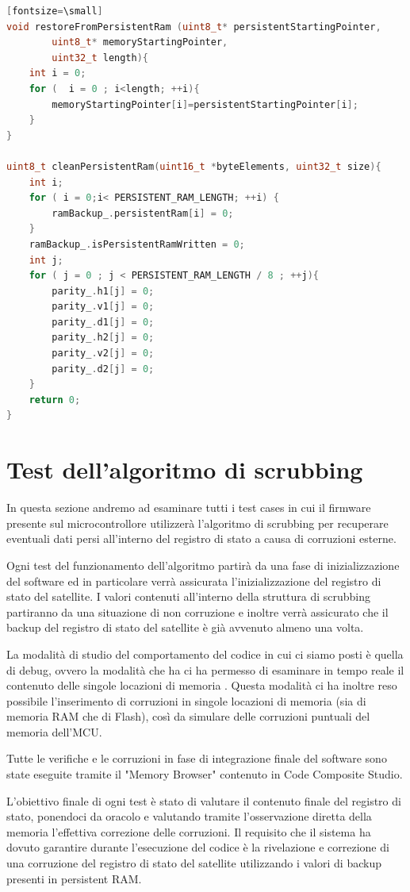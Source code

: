 \documentclass[LaM,binding=0.6cm]{../sapthesis}
\begin{document}
\begin{lstlisting}[language=c][fontsize=\small]
void restoreFromPersistentRam (uint8_t* persistentStartingPointer,
        uint8_t* memoryStartingPointer,
        uint32_t length){
    int i = 0;
    for (  i = 0 ; i<length; ++i){
        memoryStartingPointer[i]=persistentStartingPointer[i];
    }
}

uint8_t cleanPersistentRam(uint16_t *byteElements, uint32_t size){
    int i;
    for ( i = 0;i< PERSISTENT_RAM_LENGTH; ++i) {
        ramBackup_.persistentRam[i] = 0;
    }
    ramBackup_.isPersistentRamWritten = 0;
    int j;
    for ( j = 0 ; j < PERSISTENT_RAM_LENGTH / 8 ; ++j){
        parity_.h1[j] = 0;
        parity_.v1[j] = 0;
        parity_.d1[j] = 0;
        parity_.h2[j] = 0;
        parity_.v2[j] = 0;
        parity_.d2[j] = 0;
    }
    return 0;
}
\end{lstlisting}
\clearpage

\section{Test dell'algoritmo di scrubbing}

In questa sezione andremo ad esaminare tutti i test cases in cui il firmware presente sul microcontrollore utilizzerà l'algoritmo di scrubbing per recuperare eventuali dati persi all'interno del registro di stato a causa di corruzioni esterne.

Ogni test del funzionamento dell'algoritmo partirà da una fase di inizializzazione del software ed in particolare verrà assicurata l'inizializzazione del registro di stato del satellite. I valori contenuti all'interno della struttura di scrubbing partiranno da una situazione di non corruzione e inoltre verrà assicurato che il backup del registro di stato del satellite è già avvenuto almeno una volta.

La modalità di studio del comportamento del codice in cui ci siamo posti è quella di debug, ovvero la modalità che ha ci ha permesso di esaminare in tempo reale il contenuto delle singole locazioni di memoria .
Questa modalità ci ha inoltre reso possibile l'inserimento di corruzioni in singole locazioni di memoria (sia di memoria RAM che di Flash), così da simulare delle corruzioni puntuali del memoria dell'MCU.

Tutte le verifiche e le corruzioni in fase di integrazione finale del software sono state eseguite tramite il "Memory Browser" contenuto in Code Composite Studio.

L'obiettivo finale di ogni test è stato di valutare il contenuto finale del registro di stato, ponendoci da oracolo e valutando tramite l'osservazione diretta della memoria l'effettiva correzione delle corruzioni.\newline\newline
Il requisito che il sistema ha dovuto garantire durante l'esecuzione del codice è la rivelazione e correzione di una corruzione del registro di stato del satellite utilizzando i valori di backup presenti in persistent RAM.
\end{document}
